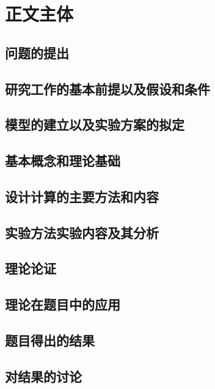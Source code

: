 \chapter{正文主体}
\section{问题的提出}
\section{研究工作的基本前提以及假设和条件}
\section{模型的建立以及实验方案的拟定}
\section{基本概念和理论基础}
\section{设计计算的主要方法和内容}
\section{实验方法实验内容及其分析}
\section{理论论证}
\section{理论在题目中的应用}
\section{题目得出的结果}
\section{对结果的讨论}
